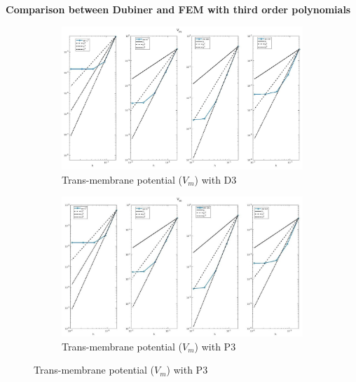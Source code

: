 \documentclass[a4paper,11pt]{article}
\begin{document}
\newpage
\begin{center}
\textbf{Comparison between Dubiner and FEM with third order polynomials}
\end{center}
\begin{figure}[H]
\caption{Comparison of the trans-membrane potential ($V_m$)}
\label{Vm_3}
\begin{subfigure}{\textwidth}
\begin{center}
\includegraphics[width =\textwidth]{./D3_Vm_1.jpg}
\caption{Trans-membrane potential  ($V_m$) with D3}
\end{center}
\end{subfigure}
\begin{subfigure}{\textwidth}
\begin{center}
\includegraphics[width =\textwidth]{./P3_Vm_1.jpg}
\caption{Trans-membrane potential  ($V_m$) with P3}
\end{center}
\end{subfigure}
\end{figure}
\end{document}
